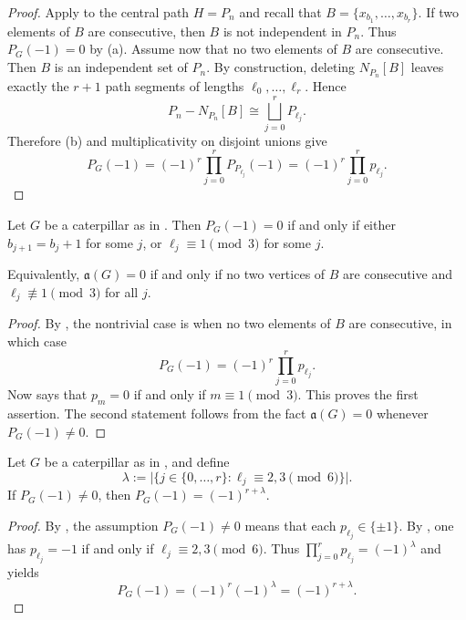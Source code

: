 \documentclass[12pt]{amsart}
\theoremstyle{plain}
\theoremstyle{definition}
\begin{document}
\begin{proof}
Apply  to the central path \(H=P_n\) and recall that $B=\{x_{b_1},\dots,x_{b_r}\}$.
If two elements of \(B\) are consecutive, then \(B\) is not independent in \(P_n\). Thus
\(P_G(-1)=0\) by \textup{(a)}. Assume now that no two elements of \(B\) are consecutive. Then \(B\) is an independent
set of \(P_n\). By construction, deleting \(N_{P_n}[B]\) leaves exactly the \(r+1\)
path segments of lengths \(\ell_0,\dots,\ell_r\). Hence
\[
P_n-N_{P_n}[B]\cong \bigsqcup_{j=0}^r P_{\ell_j}.
\]
Therefore \textup{(b)} and multiplicativity on disjoint
unions give
\[
P_G(-1)=(-1)^r\prod_{j=0}^r P_{P_{\ell_j}}(-1)
=
(-1)^r\prod_{j=0}^r p_{\ell_j}.
\]
\end{proof}

\begin{cor}\label{cor:caterpillar-zero}
Let \(G\) be a caterpillar as in . Then $P_G(-1)=0$ if and only if  either  $b_{j+1}=b_j+1$ for some $j$, or $\ell_j\equiv 1\pmod 3$ for some $j$.


Equivalently, $\mathfrak a(G)=0$ if and only if no two vertices of $B$ are consecutive and $\ell_j\not\equiv 1\pmod 3$ for all $j$.
\end{cor}

\begin{proof}
By , the nontrivial case is when no two elements of
\(B\) are consecutive, in which case
\[
P_G(-1)=(-1)^r\prod_{j=0}^r p_{\ell_j}.
\]
Now  says that \(p_m=0\) if and only if \(m\equiv 1\pmod 3\).
This proves the first assertion. The second statement follows from the fact  $\mathfrak a(G)=0$ whenever $P_G(-1)\neq 0$.
\end{proof}

\begin{cor}\label{cor:caterpillar-sign}
Let \(G\) be a caterpillar as in , and define
\[
\lambda:=\Big|\{ j\in\{0,\dots,r\}: \ell_j\equiv 2,3 \pmod 6 \}\Big|.
\]
If \(P_G(-1)\neq 0\), then $P_G(-1)=(-1)^{r+\lambda}$.
\end{cor}

\begin{proof}
By , the assumption \(P_G(-1)\neq 0\) means that each
\(p_{\ell_j}\in\{\pm 1\}\). By , one has $p_{\ell_j}=-1 $ if and only if $\ell_j\equiv 2,3\pmod 6$. Thus $\prod_{j=0}^r p_{\ell_j}=(-1)^{\lambda}$  and  yields
\[
P_G(-1)=(-1)^r(-1)^\lambda=(-1)^{r+\lambda}.
\]
\end{proof}
\end{document}
